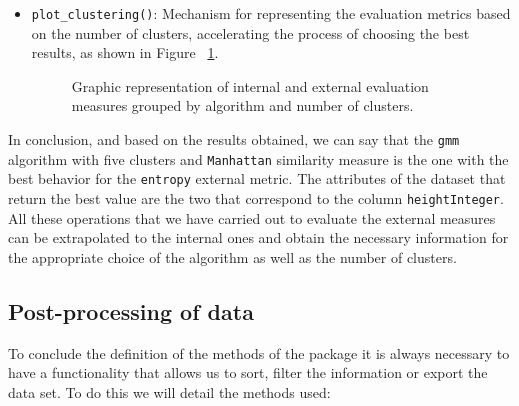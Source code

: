 \begin{itemize}
\item \texttt{plot\_clustering()}: Mechanism for representing the evaluation metrics based on the number of clusters, accelerating the process of choosing the best results, as shown in Figure ~\ref{fig:clustering}.

\begin{figure}[htbp]
  \centering
    \qquad
    \caption{Graphic representation of internal and external evaluation measures grouped by algorithm and number of clusters.}%
    \label{fig:clustering}%
\end{figure}

\end{itemize}
In conclusion, and based on the results obtained, we can say that the \texttt{gmm} algorithm with five clusters and \texttt{Manhattan} similarity measure is the one with the best behavior for the \texttt{entropy} external metric. The attributes of the dataset that return the best value are the two that correspond to the column \texttt{heightInteger}.
All these operations that we have carried out to evaluate the external measures can be extrapolated to the internal ones and obtain the necessary information for the appropriate choice of the algorithm as well as the number of clusters.\\

\subsection {Post-processing of data}

To conclude the definition of the methods of the package it is always necessary to have a functionality that allows us to sort, filter the information or export the data set. To do this we will detail the methods used:

